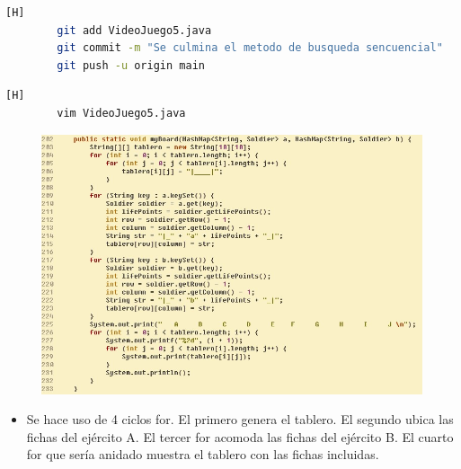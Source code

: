 \documentclass{article}
\begin{document}
	
	
	\begin{lstlisting}[language=bash,caption={Commit: a0365cf1eebf124b7cfd8019ec7895186cb90074}][H]
		git add VideoJuego5.java
		git commit -m "Se culmina el metodo de busqueda sencuencial"			
		git push -u origin main
	\end{lstlisting}
	
	



	
	
	\begin{lstlisting}[language=bash,caption={Se modifica el método que imprime el tablero}][H]
		vim VideoJuego5.java
	\end{lstlisting}
	
	\begin{figure}[H]
		\centering
		\includegraphics[width=1.1\textwidth,keepaspectratio]{img/myBoard.jpg}
	\end{figure}
	
	
	\begin{itemize}	
		\item Se hace uso de 4 ciclos for. El primero genera el tablero. El segundo ubica las fichas del ejército A. El tercer for acomoda las fichas del ejército B. El cuarto for que sería anidado muestra el tablero con las fichas incluidas.
	\end{itemize}
	

	
	
\end{document}
